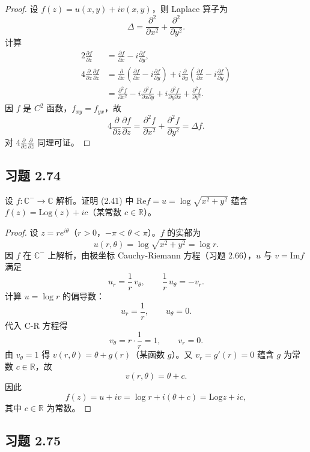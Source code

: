 \documentclass[11pt,a4paper]{article}
\newcommand{\R}{\mathbb{R}}
\newcommand{\C}{\mathbb{C}}
\renewcommand{\Re}{\mathrm{Re}}
\renewcommand{\Im}{\mathrm{Im}}
\newcommand{\Log}{\mathrm{Log}}
\theoremstyle{definition}
\begin{document}
\begin{proof}
设 $f(z) = u(x,y) + iv(x,y)$，则 Laplace 算子为
\[
  \Delta = \frac{\partial^2}{\partial x^2} + \frac{\partial^2}{\partial y^2}.
\]
计算
\[
  \begin{aligned}
    2\frac{\partial f}{\partial z} &= \frac{\partial f}{\partial x}
    - i \frac{\partial f}{\partial y}, \\
    4\frac{\partial }{\partial \bar{z}}\frac{\partial f}{\partial z}
    &= \frac{\partial}{\partial x}\left(\frac{\partial f}{\partial x}
    - i \frac{\partial f}{\partial y} \right) + i
    \frac{\partial}{\partial y}\left(\frac{\partial f}{\partial x}
    - i \frac{\partial f}{\partial y} \right) \\
    &= \frac{\partial^2 f}{\partial x^2} - i \frac{\partial^2
    f}{\partial x \partial y} + i\frac{\partial^2 f}{\partial
    y \partial x} + \frac{\partial^2 f}{\partial y^2}.
  \end{aligned}
\]
因 $f$ 是 $C^2$ 函数，$f_{xy} = f_{yx}$，故
\[
  4\frac{\partial }{\partial \bar{z}}\frac{\partial f}{\partial z}
  = \frac{\partial^2 f}{\partial x^2}+ \frac{\partial^2 f}{\partial y^2} = \Delta f.
\]
对 $4\frac{\partial}{\partial z} \frac{\partial}{\partial \bar{z}}$ 同理可证。
\end{proof}

\subsection{习题 2.74}

设 $f : \C^- \to \C$ 解析。证明 (2.41) 中 $\Re f = u = \log \sqrt{x^2+y^2}$ 蕴含 $f(z) = \Log(z) + ic$（某常数 $c \in \R$）。

\begin{proof}
设 $z = re^{i\theta}$（$r > 0$，$-\pi < \theta < \pi$）。$f$ 的实部为
\[
  u(r, \theta) = \log\sqrt{x^2 + y^2} = \log r.
\]
因 $f$ 在 $\C^-$ 上解析，由极坐标 Cauchy-Riemann 方程（习题 2.66），$u$ 与 $v = \Im f$ 满足
\[
  u_r = \frac{1}{r}\,v_\theta, \qquad \frac{1}{r}\,u_\theta = -v_r.
\]
计算 $u = \log r$ 的偏导数：
\[
  u_r = \frac{1}{r}, \qquad u_\theta = 0.
\]
代入 C-R 方程得
\[
  v_\theta = r \cdot \frac{1}{r} = 1, \qquad v_r = 0.
\]
由 $v_\theta = 1$ 得 $v(r, \theta) = \theta + g(r)$（某函数 $g$）。又 $v_r = g'(r) = 0$ 蕴含 $g$ 为常数 $c \in \R$，故
\[
  v(r, \theta) = \theta + c.
\]
因此
\[
  f(z) = u + iv = \log r + i(\theta + c) = \Log z + ic,
\]
其中 $c \in \R$ 为常数。
\end{proof}

\subsection{习题 2.75}
\end{document}
